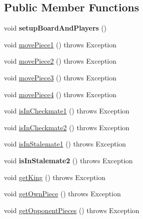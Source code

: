 \subsection*{Public Member Functions}
\begin{DoxyCompactItemize}
\item 
\mbox{\label{classtest_1_1_player_test_a0c765458717b0bd798bf30917421e4c9}} 
void {\bfseries setup\+Board\+And\+Players} ()
\item 
void \mbox{\hyperlink{classtest_1_1_player_test_acc727d15c4b9047f5b91d30929b88cac}{move\+Piece1}} ()  throws Exception 
\item 
void \mbox{\hyperlink{classtest_1_1_player_test_a98a741ccef6e205a375db45f1292795a}{move\+Piece2}} ()  throws Exception 
\item 
void \mbox{\hyperlink{classtest_1_1_player_test_aab36d53fa06c66d4f9d8c091faebabc7}{move\+Piece3}} ()  throws Exception 
\item 
void \mbox{\hyperlink{classtest_1_1_player_test_ae63bfc10956604a272dfb769c713892f}{move\+Piece4}} ()  throws Exception 
\item 
void \mbox{\hyperlink{classtest_1_1_player_test_aad1ab6c518ab00c9bae07d229f07dd60}{is\+In\+Checkmate1}} ()  throws Exception 
\item 
void \mbox{\hyperlink{classtest_1_1_player_test_ac2a028bc355f58cd35398bd0c948403f}{is\+In\+Checkmate2}} ()  throws Exception 
\item 
void \mbox{\hyperlink{classtest_1_1_player_test_a0b1c927561968c583b282814f7940655}{is\+In\+Stalemate1}} ()  throws Exception 
\item 
\mbox{\label{classtest_1_1_player_test_a19e8df2a5d16722d503b51fe8a72835c}} 
void {\bfseries is\+In\+Stalemate2} ()  throws Exception 
\item 
void \mbox{\hyperlink{classtest_1_1_player_test_a7d877a7e126bb1e49ba84ab606dc7fc6}{get\+King}} ()  throws Exception 
\item 
void \mbox{\hyperlink{classtest_1_1_player_test_a79edf065f06225fbd9d83323a2976b6c}{get\+Own\+Piece}} ()  throws Exception 
\item 
void \mbox{\hyperlink{classtest_1_1_player_test_a492f1c20801511404ba2245fb1706c96}{get\+Opponent\+Pieces}} ()  throws Exception
\end{DoxyCompactItemize}
